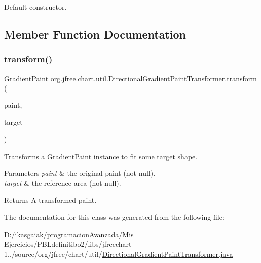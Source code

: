 Default constructor. 

\subsection{Member Function Documentation}
\mbox{\label{classorg_1_1jfree_1_1chart_1_1util_1_1_directional_gradient_paint_transformer_ae4c496333f96b718c47e8e7a9e65cd44}} 
\subsubsection{\texorpdfstring{transform()}{transform()}}
{\footnotesize\ttfamily Gradient\+Paint org.\+jfree.\+chart.\+util.\+Directional\+Gradient\+Paint\+Transformer.\+transform (\begin{DoxyParamCaption}\item[{Gradient\+Paint}]{paint,  }\item[{Shape}]{target }\end{DoxyParamCaption})}

Transforms a {\ttfamily Gradient\+Paint} instance to fit some target shape.


\begin{DoxyParams}{Parameters}
{\em paint} & the original paint (not {\ttfamily null}). \\
\hline
{\em target} & the reference area (not {\ttfamily null}).\\
\hline
\end{DoxyParams}
\begin{DoxyReturn}{Returns}
A transformed paint. 
\end{DoxyReturn}


The documentation for this class was generated from the following file\+:\begin{DoxyCompactItemize}
\item 
D\+:/ikasgaiak/programacion\+Avanzada/\+Mis Ejercicios/\+P\+B\+Ldefinitibo2/libs/jfreechart-\/1../source/org/jfree/chart/util/\mbox{\hyperlink{_directional_gradient_paint_transformer_8java}{Directional\+Gradient\+Paint\+Transformer.\+java}}\end{DoxyCompactItemize}
